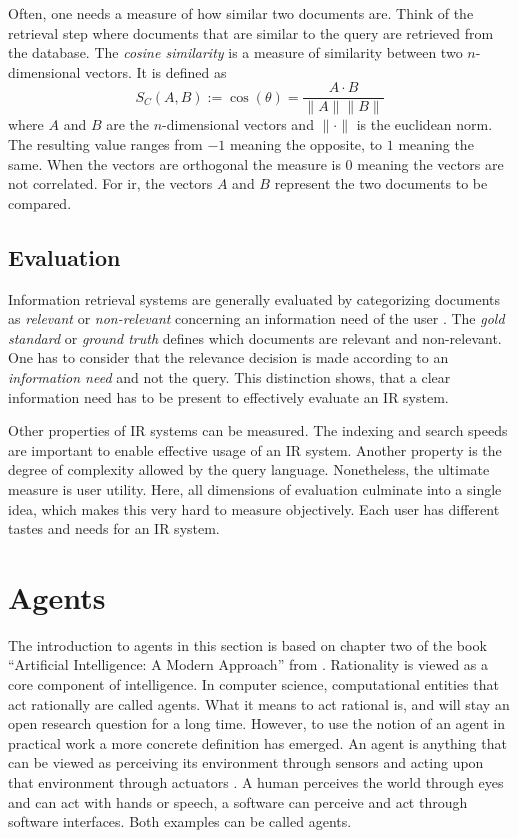 \documentclass[../main.tex]{subfiles}
\begin{document}
Often, one needs a measure of how similar two documents are.
Think of the retrieval step where documents that are similar to the query
are retrieved from the database.
The \emph{cosine similarity} is a measure of similarity
between two $n$-dimensional vectors.
It is defined as
\begin{equation}
    S_C(A,B) := \cos(\theta) = \frac{A \cdot B}{\lVert A \rVert \lVert B \rVert}
\end{equation}
where $A$ and $B$ are the $n$-dimensional vectors and $\lVert \cdot \rVert$ is the
euclidean norm. The resulting value ranges from $-1$ meaning the opposite, to $1$ meaning
the same. When the vectors are orthogonal the measure is $0$ meaning the vectors are not
correlated. For \gls{ir}, the vectors $A$ and $B$ represent the two documents to be compared.


\subsection{Evaluation}

Information retrieval systems are generally evaluated by categorizing documents
as \emph{relevant} or \emph{non-relevant} concerning an information need of the user \cite{Manning2009}.
The \emph{gold standard} or \emph{ground truth} defines which documents are relevant and non-relevant.
One has to consider that the relevance
decision is made according to an \emph{information need} and not the query.
This distinction shows,
that a clear information need has to be present to effectively evaluate an IR system.

Other properties of IR systems can be measured.
The indexing and search speeds are important to enable effective usage of an IR system.
Another property is the degree of complexity allowed by the query language.
Nonetheless, the ultimate measure is user utility.
Here, all dimensions of evaluation culminate into a single idea,
which makes this very hard to measure objectively.
Each user has different tastes and needs for an IR system.

\section{Agents}
\label{sec:agents}

The introduction to agents in this section is based on chapter two of the book
``Artificial Intelligence: A Modern Approach'' from \citeauthor{Russel2022} \cite{Russel2022}.
Rationality is viewed as a core component of intelligence.
In computer science, computational entities that act rationally are called agents.
What it means to act rational is, and will stay an open research question for a long time.
However, to use the notion of an agent in practical work a more concrete definition has emerged.
An agent is anything that can be viewed as perceiving its environment through sensors
and acting upon that environment through actuators \cite{Russel2022}.
A human perceives the world through eyes and can act with hands or speech,
a software can perceive and act through software interfaces.
Both examples can be called agents.
\end{document}
